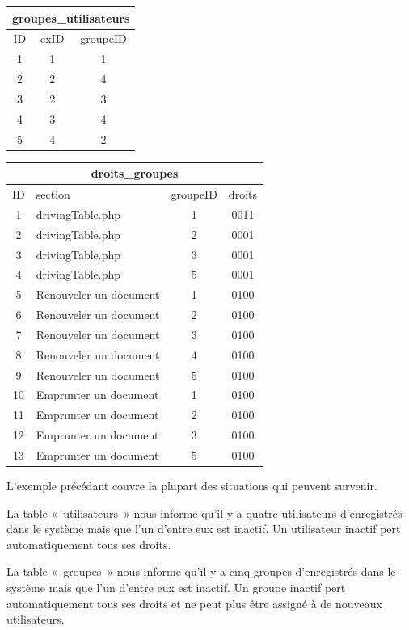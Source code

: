 \documentclass[letter, 10pt]{report}
\begin{document}
\begin{tabular}{|c|c|c|}
	\hline
	\multicolumn{3}{|c|}{groupes\_utilisateurs} \\
	\hline
	ID & exID & groupeID \\
	\hline
	1  & 1    & 1 \\
	2  & 2    & 4 \\
	3  & 2    & 3 \\
	4  & 3    & 4 \\
	5  & 4    & 2 \\
	\hline
\end{tabular}

\begin{tabular}{|c|l|c|c|}
	\hline
	\multicolumn{4}{|c|}{droits\_groupes} \\
	\hline
	ID & section                & groupeID & droits \\
	\hline
	1  & drivingTable.php       & 1        & 0011 \\
	2  & drivingTable.php       & 2        & 0001 \\
	3  & drivingTable.php       & 3        & 0001 \\
	4  & drivingTable.php       & 5        & 0001 \\
	5  & Renouveler un document & 1        & 0100 \\
	6  & Renouveler un document & 2        & 0100 \\
	7  & Renouveler un document & 3        & 0100 \\
	8  & Renouveler un document & 4        & 0100 \\
	9  & Renouveler un document & 5        & 0100 \\
	10 & Emprunter un document  & 1        & 0100 \\
	11 & Emprunter un document  & 2        & 0100 \\
	12 & Emprunter un document  & 3        & 0100 \\
	13 & Emprunter un document  & 5        & 0100 \\
	\hline
\end{tabular}

L'exemple précédant couvre la plupart des situations qui peuvent survenir.

La table «~utilisateurs~» nous informe qu'il y a quatre utilisateurs d'enregistrés dans le système mais que l'un d'entre eux est inactif. Un utilisateur inactif pert automatiquement tous ses droits.

La table «~groupes~» nous informe qu'il y a cinq groupes d'enregistrés dans le système mais que l'un d'entre eux est inactif. Un groupe inactif pert automatiquement tous ses droits et ne peut plus être assigné à de nouveaux utilisateurs.
\end{document}
